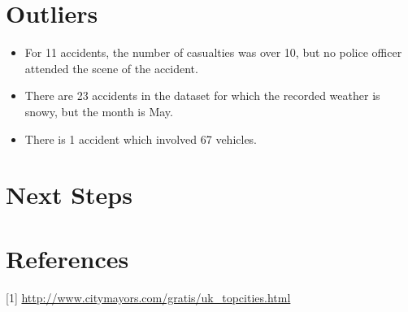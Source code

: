 \documentclass[a4paper, 10pt]{article}
\begin{document}
 \section{Outliers}
 \begin{itemize}
 \item For 11 accidents, the number of casualties was over 10, but no police officer attended the scene of the accident.
 \item There are 23 accidents in the dataset for which the recorded weather is snowy, but the month is May.
 \item There is 1 accident which involved 67 vehicles.  
 \end{itemize}
   \section{Next Steps}
   
 \section{References}
 [1] \url{http://www.citymayors.com/gratis/uk\_topcities.html}
\end{document}
